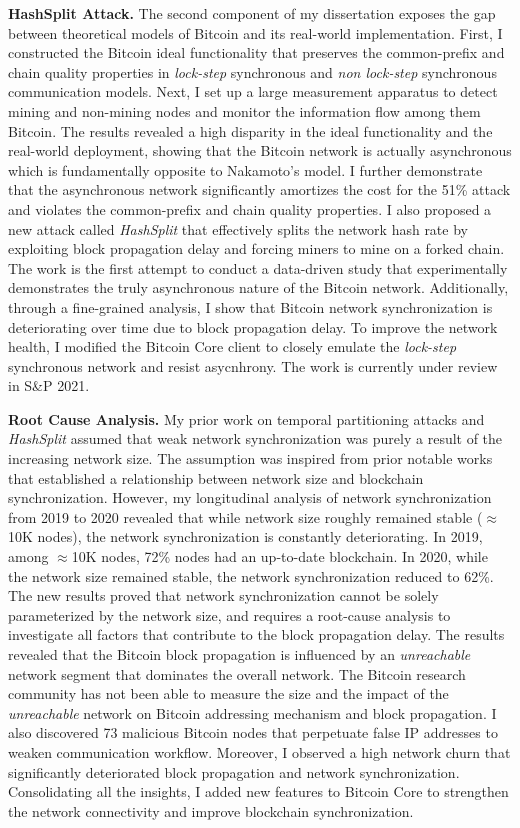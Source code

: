 \documentclass{NSF}
\newcommand{\BfPara}[1]{{\noindent\textbf{#1.}}\xspace}
\begin{document}
\BfPara{HashSplit Attack} The second component of my dissertation exposes the gap between theoretical models of Bitcoin and its real-world implementation. First, I constructed the Bitcoin ideal functionality that preserves the common-prefix and chain quality properties in {\em lock-step} synchronous and {\em non lock-step} synchronous communication models. Next, I set up a large measurement apparatus to detect mining and non-mining nodes and monitor the information flow among them Bitcoin. The results revealed a high disparity in the ideal functionality and the real-world deployment, showing that the Bitcoin network is actually asynchronous which is fundamentally opposite to Nakamoto's model. I further demonstrate that the asynchronous network significantly amortizes the cost for the 51\% attack and violates the common-prefix and chain quality properties. I also proposed a new attack called {\em HashSplit} that effectively splits the network hash rate by exploiting block propagation delay and forcing miners to mine on a forked chain. The work is the first attempt to conduct a data-driven study that experimentally demonstrates the truly asynchronous nature of the Bitcoin network. Additionally, through a fine-grained analysis, I show that Bitcoin network synchronization is deteriorating over time due to block propagation delay. To improve the network health, I modified the Bitcoin Core client to closely emulate the {\em lock-step} synchronous network and resist asycnhrony. The work is currently under review in S\&P 2021. 


\BfPara{Root Cause Analysis} My prior work on temporal partitioning attacks and {\em HashSplit} assumed that weak network synchronization was purely a result of the increasing network size. The assumption was inspired from prior notable works that established a relationship between network size and blockchain synchronization. However, my longitudinal analysis of network synchronization from 2019 to 2020 revealed that while network size roughly remained stable ($\approx$10K nodes), the network synchronization is constantly deteriorating. In 2019, among $\approx$10K nodes, 72\% nodes had an up-to-date blockchain. In 2020, while the network size remained stable, the network synchronization reduced to 62\%. The new results proved that network synchronization cannot be solely parameterized by the network size, and requires a root-cause analysis to investigate all factors that contribute to the block propagation delay. The results revealed that the Bitcoin block propagation is influenced by an {\em unreachable} network segment that dominates the overall network. The Bitcoin research community has not been able to measure the size and the impact of the {\em unreachable} network on Bitcoin addressing mechanism and block propagation. I also discovered 73 malicious Bitcoin nodes that perpetuate false IP addresses to weaken communication workflow. Moreover, I observed a high network churn that significantly deteriorated block propagation and network synchronization. Consolidating all the insights, I added new features to Bitcoin Core to strengthen the network connectivity and improve blockchain synchronization.  
\end{document}
